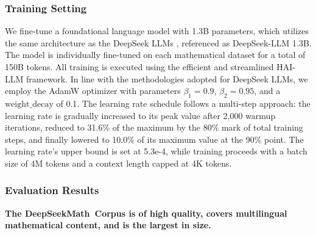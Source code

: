 \begin{itemize}[topsep=0pt]
\subsubsection{Training Setting}
\label{sec:quality-policy}
We fine-tune a foundational language model with 1.3B parameters, which utilizes the same architecture as the DeepSeek LLMs \citep{deepseek-llm}, referenced as DeepSeek-LLM 1.3B. The model is individually fine-tuned on each mathematical dataset for a total of 150B tokens. All training is executed using the efficient and streamlined HAI-LLM \citep{haillm} framework. In line with the methodologies adopted for DeepSeek LLMs, we employ the AdamW optimizer \citep{adamW} with parameters $\beta_1=0.9$, $\beta_2=0.95$, and a $\mathrm{weight\_decay}$ of 0.1. The learning rate schedule follows a multi-step approach: the learning rate is gradually increased to its peak value after 2,000 warmup iterations, reduced to 31.6\% of the maximum by the 80\% mark of total training steps, and finally lowered to 10.0\% of its maximum value at the 90\% point. The learning rate’s upper bound is set at 5.3e-4, while training proceeds with a batch size of 4M tokens and a context length capped at 4K tokens.

\subsubsection{Evaluation Results}

\textbf{The DeepSeekMath~Corpus is of high quality, covers multilingual mathematical content, and is the largest in size.}


\end{itemize}
